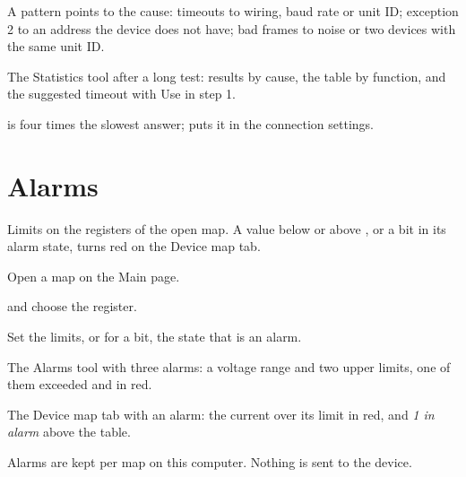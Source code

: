 A pattern points to the cause: timeouts to wiring, baud rate or unit ID;
exception 2 to an address the device does not have; bad frames to noise or
two devices with the same unit ID.

  {The Statistics tool after a long test: results by cause, the table by
   function, and the suggested timeout with Use in step 1.}

 is four times the slowest answer;
 puts it in the connection settings.

\section{Alarms}

Limits on the registers of the open map. A value below  or above
, or a bit in its alarm state, turns red on the Device map tab.

\begin{steps}
  \item Open a map on the Main page.
  \item {} and choose the register.
  \item Set the limits, or for a bit, the state that is an alarm.
\end{steps}

  {The Alarms tool with three alarms: a voltage range and two upper limits,
   one of them exceeded and in red.}

  {The Device map tab with an alarm: the current over its limit in red, and
   \emph{1 in alarm} above the table.}

Alarms are kept per map on this computer. Nothing is sent to the device.
